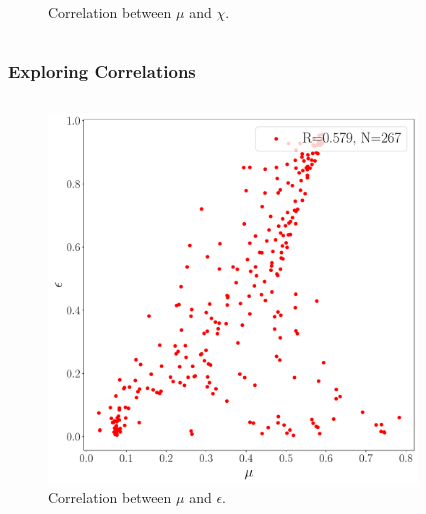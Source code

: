 \documentclass{beamer}
\begin{document}
\begin{frame}
\begin{columns}
\begin{column}{0.5\textwidth}
\begin{figure}
\caption{Correlation between $\mu$ and $\chi$.}
\end{figure}
\end{column}
\end{columns}
\end{frame}

\begin{frame}
\frametitle{Exploring Correlations}
\begin{columns}
\begin{column}{0.5\textwidth}
\begin{figure}
\centering 
\includegraphics[width=\textwidth]{im/mu_v_eps_}
\caption{Correlation between $\mu$ and $\epsilon$.}
\end{figure}
\end{column}
\begin{column}{0.5\textwidth}
\begin{figure}
\centering 

\end{figure}
\end{column}
\end{columns}
\end{frame}
\end{document}
